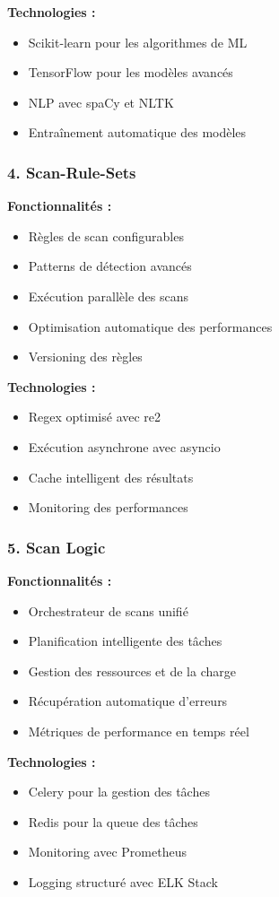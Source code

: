 \documentclass[12pt,a4paper]{article}
\begin{document}
\textbf{Technologies :}
\begin{itemize}
    \item Scikit-learn pour les algorithmes de ML
    \item TensorFlow pour les modèles avancés
    \item NLP avec spaCy et NLTK
    \item Entraînement automatique des modèles
\end{itemize}

\subsubsection{4. Scan-Rule-Sets}
\textbf{Fonctionnalités :}
\begin{itemize}
    \item Règles de scan configurables
    \item Patterns de détection avancés
    \item Exécution parallèle des scans
    \item Optimisation automatique des performances
    \item Versioning des règles
\end{itemize}

\textbf{Technologies :}
\begin{itemize}
    \item Regex optimisé avec re2
    \item Exécution asynchrone avec asyncio
    \item Cache intelligent des résultats
    \item Monitoring des performances
\end{itemize}

\subsubsection{5. Scan Logic}
\textbf{Fonctionnalités :}
\begin{itemize}
    \item Orchestrateur de scans unifié
    \item Planification intelligente des tâches
    \item Gestion des ressources et de la charge
    \item Récupération automatique d'erreurs
    \item Métriques de performance en temps réel
\end{itemize}

\textbf{Technologies :}
\begin{itemize}
    \item Celery pour la gestion des tâches
    \item Redis pour la queue des tâches
    \item Monitoring avec Prometheus
    \item Logging structuré avec ELK Stack
\end{itemize}
\end{document}
